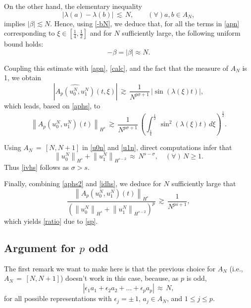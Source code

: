 \documentclass{amsart}
\begin{document}
On the other hand, the elementary inequality
\[
\left|\lambda(a)-\lambda(b)\right|\,\lesssim \,N, \qquad (\forall) a,b \in A_N, 
\]
implies $|\beta|\lesssim N$. Hence, using \eqref{-bN}, we deduce that, for all the terms in \eqref{apn} corresponding to $\xi \in \left[\frac{1}{4},\frac{1}{2}\right]$ and for $N$ sufficiently large, the following uniform bound holds:
\begin{equation}
-\beta= |\beta| \approx N.
\label{beven}
\end{equation}

Coupling this estimate with \eqref{apn}, \eqref{calc}, and the fact that the measure of $A_N$ is 1, we obtain
\[
\left|\widehat{A_p(u^N_0,u^N_1)}(t,\xi)\right|\,\gtrsim\,\frac{1}{N^{p\sigma+1}}\,|\sin(\lambda(\xi)t)|,
\]  
which leads, based on \eqref{aphs}, to
\begin{equation}
\left\|A_{p}\left(u_0^N,u_1^N\right)(t)\right\|_{H^s}\,\gtrsim\,  \frac{1}{N^{p\sigma+1}}\, \left(\int_\frac{1}{4}^\frac{1}{2}\,\sin^2(\lambda(\xi)t)\,d\xi\right)^\frac{1}{2}.
\label{aphs2}
\end{equation} 

Using $A_N\,=\,[N,N+1]$ in \eqref{u0n} and \eqref{u1n}, direct computations infer that 
\begin{equation}
\left\|u_0^N\right\|_{H^{s}} + \left\|u_1^N\right\|_ {H^{{s}-2}}\,\approx\,N^{s-\sigma},\quad (\forall)\,N\geq 1.\label{idhs} 
\end{equation}
Thus \eqref{ivhs} follows as $\sigma>s$. 

Finally,  combining \eqref{aphs2} and \eqref{idhs}, we deduce for $N$ sufficiently large that
\begin{equation}
 \frac{\left\|A_{p}(u_0^N,u_1^N)(t)\right\|_{H^s}}{\left(\left\|u_0^N\right\|_{H^{s}} + \left\|u_1^N\right\|_ {H^{{s}-2}}\right)^p}\,\gtrsim\, \frac{1}{N^{ps+1}},\end{equation}
which yields \eqref{ratio} due to \eqref{sp}.

\subsection{Argument for \texorpdfstring{$p$}{} odd}
The first remark we want to make here is that the previous choice for $A_N$ (i.e., $A_N\,=\,[N,N+1]$) doesn't work in this case, because, as $p$ is odd, 
\[
\left|\epsilon_1 a_1+\epsilon_2 a_2+ \ldots+\epsilon_p a_p\right|\,\approx\,N, 
\]
for all possible representations with $\epsilon_j=\pm \,1$, $a_j\in A_N$,  and $1\leq j\leq p$. 
\end{document}
